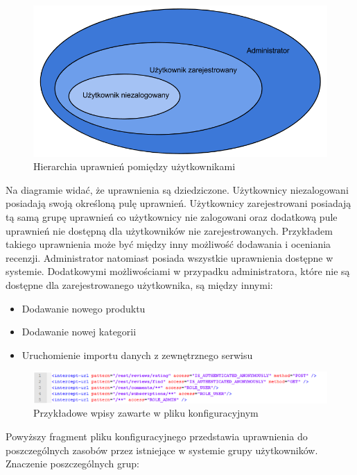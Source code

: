 \begin{figure}[h]
	\centering
	\includegraphics[scale=0.5]{images/hierarchia_uprawnien.png}
	\caption{Hierarchia uprawnień pomiędzy użytkownikami}
\end{figure}

Na diagramie widać, że uprawnienia są dziedziczone. Użytkownicy niezalogowani posiadają swoją określoną pulę uprawnień. Użytkownicy zarejestrowani posiadają tą samą grupę uprawnień co użytkownicy nie zalogowani oraz dodatkową pule uprawnień nie dostępną dla użytkowników nie zarejestrowanych. Przykładem takiego uprawnienia może być między inny możliwość dodawania i oceniania recenzji. Administrator natomiast posiada wszystkie uprawnienia dostępne w systemie. Dodatkowymi możliwościami w przypadku administratora, które nie są dostępne dla zarejestrowanego użytkownika, są między innymi:

\begin{itemize}
\item Dodawanie nowego produktu
\item Dodawanie nowej kategorii
\item Uruchomienie importu danych z zewnętrznego serwisu
\end{itemize}

\begin{figure}[h]
	\centering
	\includegraphics[scale=0.7]{images/model_uprawnien_xml.png}
	\caption{Przykładowe wpisy zawarte w pliku konfiguracyjnym}
\end{figure}

Powyższy fragment pliku konfiguracyjnego przedstawia uprawnienia do poszczególnych zasobów przez istniejące w systemie grupy użytkowników. Znaczenie poszczególnych grup:

